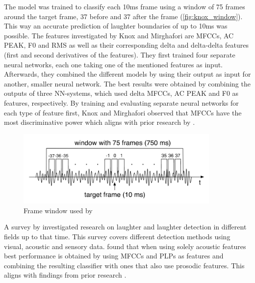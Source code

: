 \documentclass[bsc,frontabs,parskip,deptreport]{infthesis}
\begin{document}
The model was trained to classify each 10ms frame using a window of 75 frames around the target frame, 37 before and 37 after the frame (\autoref{fig:knox_window}).
This way an accurate prediction of laughter boundaries of up to 10ms was possible. 
The features investigated by Knox and Mirghafori are MFCCs, AC PEAK, F0 and RMS as well as their corresponding delta and delta-delta features (first and second derivatives of the features).
They first trained four separate neural networks, each one taking one of the mentioned features as input.
Afterwards, they combined the different models by using their output as input for another, smaller neural network.
The best results were obtained by combining the outputs of three NN-systems, which used delta MFCCs, AC PEAK and F0 as features, respectively.
By training and evaluating separate neural networks for each type of feature first, Knox and Mirghafori observed that MFCCs have the most discriminative power which aligns with prior research by \citet{kennedy2004laughter}.

\begin{figure}[htp]
    \centering
    \includegraphics[width=10cm]{imgs/Knox_window.png}
    \caption{Frame window used by \citet{knox2006automatic}}
    \label{fig:knox_window}
\end{figure}

A survey by \citet{cosentino2016quantitative} investigated research on laughter and laughter detection in different fields up to that time.
This survey covers different detection methods using visual, acoustic and sensory data.
\citet{cosentino2016quantitative} found that when using solely acoustic features best performance is obtained by using MFCCs and PLPs as features and combining the resulting classifier with ones that also use prosodic features.
This aligns with findings from prior research \citep{truong2007automatic, knox2006automatic}.
\end{document}
